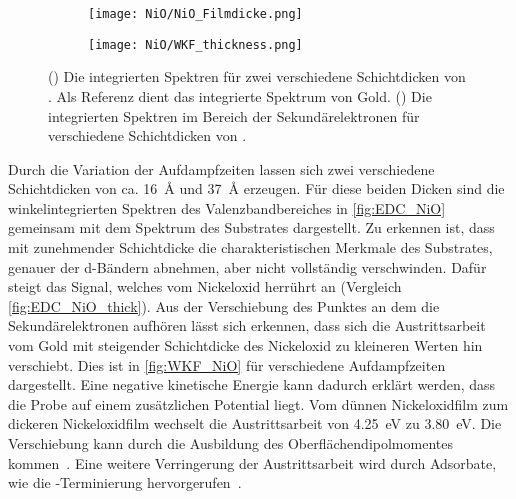         \begin{figure}
            \centering
            \begin{subfigure}[t]{0.48\textwidth}
                \centering
                \texttt{[image: NiO/NiO\_Filmdicke.png]}
                \subcaption{}
                \label{fig:EDC_NiO}
            \end{subfigure}
            \begin{subfigure}[t]{0.48\textwidth}
                \centering
                \texttt{[image: NiO/WKF\_thickness.png]}
                \caption{}
                \label{fig:WKF_NiO}
            \end{subfigure}
            \caption{() Die integrierten Spektren für zwei verschiedene Schichtdicken von . Als Referenz dient das integrierte Spektrum von Gold. 
            () Die integrierten Spektren im Bereich der Sekundärelektronen für verschiedene Schichtdicken von .}
        \end{figure}
        Durch die Variation der Aufdampfzeiten lassen sich zwei verschiedene Schichtdicken von ca. \SI{16}{\angstrom} und \SI{37}{\angstrom} erzeugen.
        Für diese beiden Dicken sind die winkelintegrierten Spektren des Valenzbandbereiches in \autoref{fig:EDC_NiO} gemeinsam mit dem Spektrum des Substrates dargestellt.
        Zu erkennen ist, dass mit zunehmender Schichtdicke die charakteristischen Merkmale des Substrates, genauer der d-Bändern abnehmen, aber nicht vollständig verschwinden.
        Dafür steigt das Signal, welches vom Nickeloxid herrührt an (Vergleich \autoref{fig:EDC_NiO_thick}).
        Aus der Verschiebung des Punktes an dem die Sekundärelektronen aufhören lässt sich erkennen, dass sich die Austrittsarbeit vom Gold mit steigender Schichtdicke des Nickeloxid zu kleineren Werten hin verschiebt.
        Dies ist in \autoref{fig:WKF_NiO} für verschiedene Aufdampfzeiten dargestellt.
        Eine negative kinetische Energie kann dadurch erklärt werden, dass die Probe auf einem zusätzlichen Potential liegt.
        Vom dünnen Nickeloxidfilm zum dickeren Nickeloxidfilm wechselt die Austrittsarbeit von \SI{4.25}{\electronvolt} zu \SI{3.80}{\electronvolt}.
        Die Verschiebung kann durch die Ausbildung des Oberflächendipolmomentes kommen~\cite{5A_5}.
        Eine weitere Verringerung der Austrittsarbeit wird durch Adsorbate, wie die -Terminierung hervorgerufen~\cite{NiO_40}.
